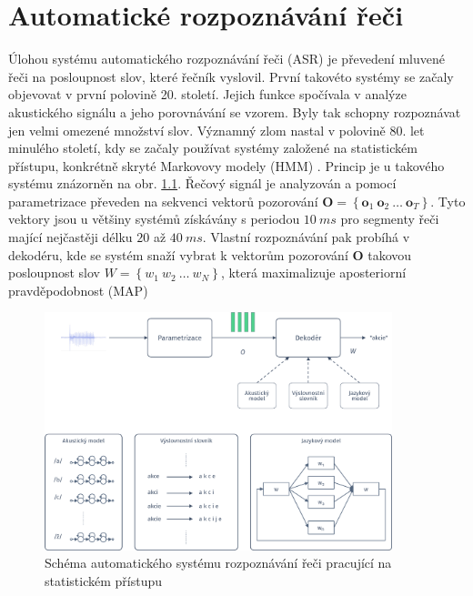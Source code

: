 \chapter{Automatické rozpoznávání řeči}
\label{chap:asr}

Úlohou systému automatického rozpoznávání řeči (ASR) je převedení mluvené řeči na posloupnost slov, které řečník vyslovil. První takovéto systémy se začaly objevovat v první polovině 20. století. Jejich funkce spočívala v analýze akustického signálu a jeho porovnávání se vzorem. Byly tak schopny rozpoznávat jen velmi omezené množství slov. Významný zlom nastal v polovině 80. let minulého století, kdy se začaly používat systémy založené na statistickém přístupu, konkrétně skryté Markovovy modely (HMM) \cite{Holmes2001}. Princip je u takového systému znázorněn na obr. \ref{fig:asr:decoding}. Řečový signál je analyzován a pomocí parametrizace převeden na sekvenci vektorů pozorování $\boldsymbol{O} = \left\{\boldsymbol{o}_1\ \boldsymbol{o}_2\ \dots\ \boldsymbol{o}_T\right\}$. Tyto vektory jsou u většiny systémů získávány s periodou $10\ ms$ pro segmenty řeči mající nejčastěji délku $20$ až $40\ ms$. Vlastní rozpoznávání pak probíhá v dekodéru, kde se systém snaží vybrat k vektorům pozorování $\boldsymbol{O}$ takovou posloupnost slov $W = \left\{w_1\ w_2\ \dots\ w_N\right\}$, která maximalizuje aposteriorní pravděpodobnost (MAP)


\begin{figure}[hbpt]
  \centering
  \includegraphics[width=0.9\textwidth]{./ch4-asr/img/decoding.pdf}
  \caption{Schéma automatického systému rozpoznávání řeči pracující na statistickém přístupu}
  \label{fig:asr:decoding}
\end{figure}

